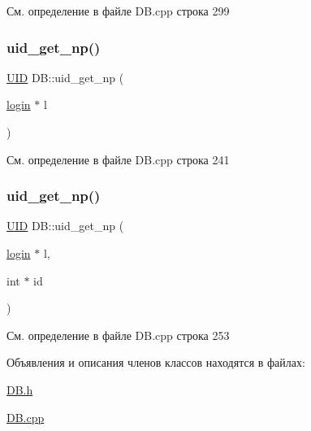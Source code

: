 См. определение в файле D\+B.\+cpp строка 299

\mbox{\label{class_d_b_a5acc70d365de65365c861533a2b755c3}} 
\subsubsection{\texorpdfstring{uid\_get\_np()}{uid\_get\_np()}\hspace{0.1cm}{\footnotesize\ttfamily [1/2]}}
{\footnotesize\ttfamily \mbox{\hyperlink{struct_u_i_d}{U\+ID}} D\+B\+::uid\+\_\+get\+\_\+np (\begin{DoxyParamCaption}\item[{\mbox{\hyperlink{structlogin}{login}} $\ast$}]{l }\end{DoxyParamCaption})}



См. определение в файле D\+B.\+cpp строка 241

\mbox{\label{class_d_b_a9c55abcaab4db2b421bf72c968a818a4}} 
\subsubsection{\texorpdfstring{uid\_get\_np()}{uid\_get\_np()}\hspace{0.1cm}{\footnotesize\ttfamily [2/2]}}
{\footnotesize\ttfamily \mbox{\hyperlink{struct_u_i_d}{U\+ID}} D\+B\+::uid\+\_\+get\+\_\+np (\begin{DoxyParamCaption}\item[{\mbox{\hyperlink{structlogin}{login}} $\ast$}]{l,  }\item[{int $\ast$}]{id }\end{DoxyParamCaption})}



См. определение в файле D\+B.\+cpp строка 253



Объявления и описания членов классов находятся в файлах\+:\begin{DoxyCompactItemize}
\item 
\mbox{\hyperlink{_d_b_8h}{D\+B.\+h}}\item 
\mbox{\hyperlink{_d_b_8cpp}{D\+B.\+cpp}}\end{DoxyCompactItemize}
